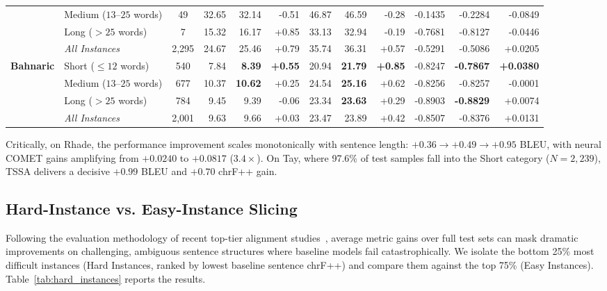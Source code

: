 \documentclass[11pt,a4paper]{article}
\begin{document}
\begin{table}[htbp]
{\begin{tabular}{llcrrrrrrrrr}
 & Medium ($13$--$25$ words) & 49 & 32.65 & 32.14 & -0.51 & 46.87 & 46.59 & -0.28 & -0.1435 & -0.2284 & -0.0849 \\
 & Long ($> 25$ words) & 7 & 15.32 & 16.17 & +0.85 & 33.13 & 32.94 & -0.19 & -0.7681 & -0.8127 & -0.0446 \\
 & \textit{All Instances} & 2,295 & 24.67 & 25.46 & +0.79 & 35.74 & 36.31 & +0.57 & -0.5291 & -0.5086 & +0.0205 \\
\midrule
\multirow{4}{*}{\textbf{Bahnaric}} & Short ($\le 12$ words) & 540 & 7.84 & \textbf{8.39} & \textcolor{topgreen}{\textbf{+0.55}} & 20.94 & \textbf{21.79} & \textcolor{topgreen}{\textbf{+0.85}} & -0.8247 & \textbf{-0.7867} & \textcolor{topgreen}{\textbf{+0.0380}} \\
 & Medium ($13$--$25$ words) & 677 & 10.37 & \textbf{10.62} & +0.25 & 24.54 & \textbf{25.16} & +0.62 & -0.8256 & -0.8257 & -0.0001 \\
 & Long ($> 25$ words) & 784 & 9.45 & 9.39 & -0.06 & 23.34 & \textbf{23.63} & +0.29 & -0.8903 & \textbf{-0.8829} & +0.0074 \\
 & \textit{All Instances} & 2,001 & 9.63 & 9.66 & +0.03 & 23.47 & 23.89 & +0.42 & -0.8507 & -0.8376 & +0.0131 \\
\bottomrule
\end{tabular}
}
\end{table}

Critically, on Rhade, the performance improvement scales monotonically with sentence length: $+0.36 \rightarrow +0.49 \rightarrow \mathbf{+0.95}$ BLEU, with neural COMET gains amplifying from $+0.0240$ to $\mathbf{+0.0817}$ ($3.4\times$). On Tay, where 97.6\% of test samples fall into the Short category ($N=2,239$), TSSA delivers a decisive $+0.99$ BLEU and $+0.70$ chrF++ gain.

\subsection{Hard-Instance vs. Easy-Instance Slicing}
\label{sec:hard_instance_analysis}

Following the evaluation methodology of recent top-tier alignment studies~\cite{wu2024direct}, average metric gains over full test sets can mask dramatic improvements on challenging, ambiguous sentence structures where baseline models fail catastrophically. We isolate the bottom 25\% most difficult instances (Hard Instances, ranked by lowest baseline sentence chrF++) and compare them against the top 75\% (Easy Instances). Table~\ref{tab:hard_instances} reports the results.
\end{document}
